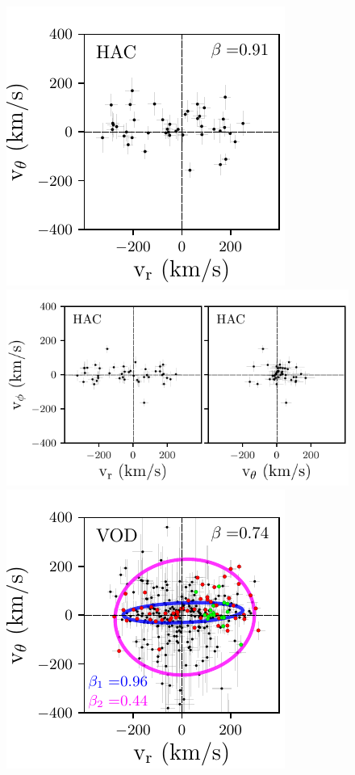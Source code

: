 \documentclass[fleqn,usenatbib]{mnras}
\begin{document}
%
\begin{figure}
	\includegraphics[scale=0.53]{HAC_velocities_vphi.pdf}
    \includegraphics[scale=0.53]{HAC_velocities_vtheta.pdf} 
  \includegraphics[scale=0.53]{VOD_velocities_vphi.pdf}

\end{figure}
\end{document}
